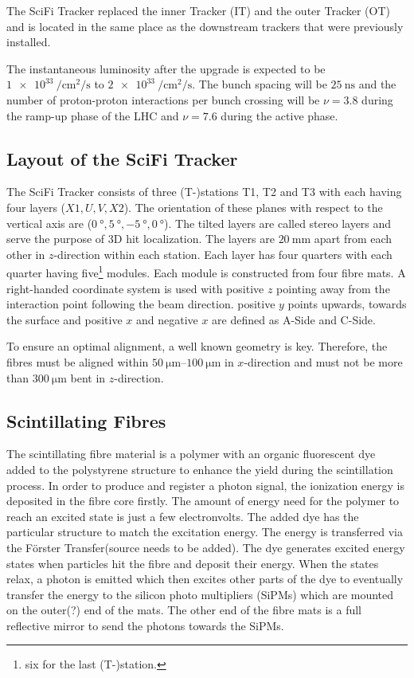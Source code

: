 The SciFi Tracker replaced the inner Tracker (IT) and the outer Tracker (OT) and is located in the same place as the downstream trackers that were previously installed.

The instantaneous luminosity after the upgrade is expected to be $\SI{1e33}{\per\centi\metre\squared\per\second}$ to $\SI{2e33}{\per\centi\metre\squared\per\second}$. The bunch spacing will be $\SI{25}{\nano\second}$ and the number of proton-proton interactions per bunch crossing will be $\nu = 3.8$ during the ramp-up phase of the LHC and $\nu = 7.6$ during the active phase.

\subsection{Layout of the SciFi Tracker}
The SciFi Tracker consists of three (T-)stations T1, T2 and T3 with each having four layers ($X1, U, V, X2$). The orientation of these planes with respect to the vertical axis are ($\SI{0}{\degree}, \SI{+5}{\degree}, \SI{-5}{\degree}, \SI{0}{\degree}$).
The tilted layers are called stereo layers and serve the purpose of 3D hit localization.
The layers are $\SI{20}{\milli\metre}$ apart from each other in $z$-direction within each station.
Each layer has four quarters with each quarter having five\footnote{six for the last (T-)station.} modules. Each module is constructed from four fibre mats.
A right-handed coordinate system is used with positive $z$ pointing away from the interaction point following the beam direction. positive $y$ points upwards, towards the surface and positive $x$ and negative $x$ are defined as A-Side and C-Side\cite{scifiInfo}.

To ensure an optimal alignment, a well known geometry is key. Therefore, the
fibres must be aligned within $\SIrange{50}{100}{\micro\metre}$ in $x$-direction and must not be more than $\SI{300}{\micro\metre}$ bent in $z$-direction.

\subsection{Scintillating Fibres}
The scintillating fibre material is a polymer with an organic fluorescent dye added to the polystyrene structure to enhance the yield during the scintillation process.
In order to produce and register a photon signal, the ionization energy is deposited in the fibre core firstly. The amount of energy need for the polymer to reach an excited state is just a few electronvolts.
The added dye has the particular structure to match the excitation energy.
The energy is transferred via the Förster Transfer(source needs to be added).
The dye generates excited energy states when particles hit the fibre and deposit their energy. When the states relax, a photon is emitted which then excites other parts of the dye to eventually transfer the energy to the silicon photo multipliers (SiPMs) which are mounted on the outer(?) end of the mats.
The other end of the fibre mats is a full reflective mirror to send the photons towards the SiPMs.



